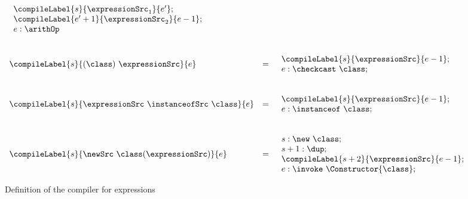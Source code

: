 \begin{figure}[ht!]
\begin{frameit}
$${\begin{array}{lll}
\begin{array}{l}
                       \compileLabel{s}{ \expressionSrc_1}{  e'  } ; \\
                       \compileLabel{e' + 1}{ \expressionSrc_2}{ e - 1  }; \\
                       e:\arithOp
                 \end{array}  \\
	& & \\ & & \\
	\compileLabel{s}{ (\class ) \ \expressionSrc }{e} & = &  
              \begin{array}{l}  
                 \compileLabel{s}{\expressionSrc}{e  - 1};\\
                  e : \checkcast \ \class ;
              \end{array}	 \\
	& & \\ & & \\ 

	\compileLabel{s}{\expressionSrc \ \instanceofSrc \ \class }{e} & = &  
         \begin{array}{l}
              \compileLabel{s}{\expressionSrc}{ e  -1 };\\
               e : \instanceof \ \class;
	  \end{array} \\
	  & & \\ & & \\ 
\compileLabel{s}{ \newSrc \ \class  (\expressionSrc ) }{e} & = & 
                 \begin{array}{l}
                       s :    \new \ \class; \\ 
		       s + 1: \dup; \\
		       \compileLabel{s+2}{\expressionSrc}{e - 1 };\\
	               
		       e : \invoke \ \Constructor{\class};     
	       \end{array}

	\end{array} 
} $$

\caption{\sc Definition of the compiler for expressions }
\label{pogEq:compile:compExpr:defExpr}
\end{frameit}
\end{figure}


